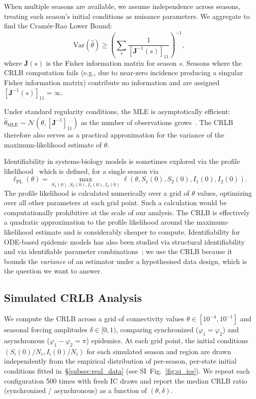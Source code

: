 When multiple seasons are available, we assume independence across
seasons, treating each season's initial conditions as nuisance
parameters. We aggregate to find the Cram\'er-Rao Lower Bound:
\begin{equation}\label{eq:crlb_multi}
\text{Var}(\hat{\theta}) \geq \left(\sum_{s} \frac{1}{
  [\mathbf{J}^{-1}(s)]_{11}}\right)^{-1},
\end{equation}
where $\mathbf{J}(s)$ is the Fisher information matrix for season $s$.
Seasons where the CRLB computation fails (e.g., due to near-zero
incidence producing a singular Fisher information matrix) contribute
no information and are assigned $[\mathbf{J}^{-1}(s)]_{11} = \infty$.

Under standard regularity conditions, the MLE is asymptotically
efficient: $\hat\theta_{\text{MLE}} \sim \mathcal{N}(\theta,
[\mathbf{J}^{-1}]_{11})$ as the number of observations
grows~\citep{casella2024statistical}. The CRLB therefore also serves
as a practical approximation for the variance of the
maximum-likelihood estimate of $\theta$.

Identifiability in systems-biology models is sometimes explored via
the profile likelihood~\citep{raue2009, shrestha2011} which is defined,
for a single season via
%
%
$$
\ell_{\text{PL}}(\theta) = \max_{S_1(0), S_2(0), I_1(0), I_2(0)} \ell(\theta, S_1(0), S_2(0), I_1(0), I_2(0)).
$$
%
%
The profile likelihood is calculated numerically over a grid of
$\theta$ values, optimizing over all other parameters at each grid
point. Such a calculation would be computationally prohibitive at the
scale of our analysis. The CRLB is effectively a quadratic
approximation to the profile likelihood around the maximum-likelihood
estimate and is considerably cheaper to compute. Identifiability for
ODE-based epidemic models has also been studied via structural
identifiability~\citep{tuncer2018, chowell2023structural} and via
identifiable parameter combinations~\citep{eisenberg2014determining};
we use the CRLB because it bounds the \emph{variance} of an
estimator under a hypothesised data design, which is the question we
want to answer.

\subsection{Simulated CRLB Analysis}\label{subsec:sim_crlb}
We compute the CRLB across a grid of connectivity values $\theta \in
[10^{-4}, 10^{-1}]$ and seasonal forcing amplitudes $\delta \in [0,
  1)$, comparing synchronized ($\varphi_1 = \varphi_2$) and
  asynchronous ($\varphi_1 - \varphi_2 = \pi$) epidemics. At each grid
  point, the initial conditions $(S_i(0)/N_i, I_i(0)/N_i)$ for each
  simulated season and region are drawn independently from the
  empirical distribution of per-season, per-state initial conditions
  fitted in~\S\ref{subsec:real_data} (see
  SI~Fig.~\ref{fig:si_ics}). We repeat each configuration 500 times
  with fresh IC draws and report the median CRLB ratio (synchronized /
  asynchronous) as a function of $(\theta, \delta)$.

